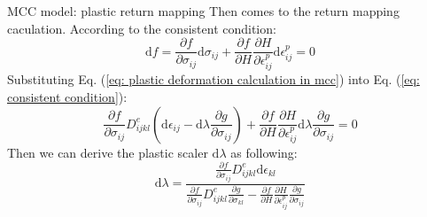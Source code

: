 \documentclass[aspectratio=169]{beamer}
\begin{document}
\begin{frame}{MCC model: plastic return mapping}
    Then comes to the return mapping caculation. 
    \vspace{2mm}
    According to the consistent condition:
    \begin{equation}
        \mathrm{d}f = \frac{\partial f}{\partial \sigma_{ij}}\mathrm{d}\sigma_{ij}+\frac{\partial f}{\partial H}\frac{\partial H}{\partial \epsilon_{ij}^{p}}\mathrm{d}\epsilon_{ij}^{p}=0
        \label{eq: consistent condition}
    \end{equation}
    Substituting Eq. (\ref{eq: plastic deformation calculation in mcc}) into Eq. (\ref{eq: consistent condition}):
    \begin{equation}
        \frac{\partial f}{\partial \sigma_{ij}}D^{e}_{ijkl}(\mathrm{d}\epsilon_{ij}-\mathrm{d}\lambda\frac{\partial g}{\partial \sigma_{ij}})+\frac{\partial f}{\partial H}\frac{\partial H}{\partial \epsilon_{ij}^{p}} \mathrm{d}\lambda\frac{\partial g}{\partial \sigma_{ij}}=0
        \label{eq: consistent condition 2}
    \end{equation}
    Then we can derive the plastic scaler $\mathrm{d} \lambda$ as following:
    \begin{equation}
        \mathrm{d}\lambda = \frac{\frac{\partial f}{\partial \sigma_{ij}} D^{e}_{ijkl} \mathrm{d} \epsilon_{kl} } {\frac{\partial f}{\partial \sigma_{ij}} D^{e}_{ijkl} \frac{\partial g}{\partial \sigma_{kl}} - \frac{\partial f}{\partial H}\frac{\partial H}{\partial \epsilon_{ij}^{p}}\frac{\partial g}{\partial \sigma_{ij}}}
        \label{eq: dlambda calculation}
    \end{equation}
\end{frame}
\end{document}
